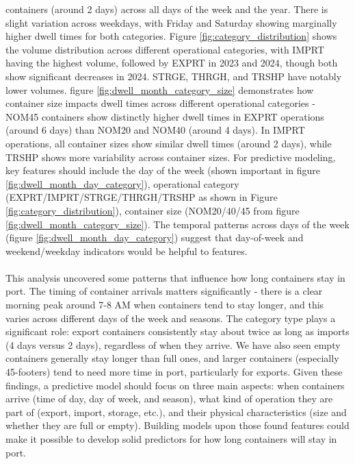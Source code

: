 			containers (around 2 days) across all days of the week and the year. There is slight variation across
			weekdays, with Friday and Saturday showing marginally higher dwell times for both categories. Figure
			\ref{fig:category_distribution} shows the volume distribution across different operational categories,
			with IMPRT having the highest volume, followed by EXPRT in 2023 and 2024, though both show significant
			decreases in 2024. STRGE, THRGH, and TRSHP have notably lower volumes. figure
			\ref{fig:dwell_month_category_size} demonstrates how container size impacts dwell times across different
			operational categories - NOM45 containers show distinctly higher dwell times in EXPRT operations (around
			6 days) than NOM20 and NOM40 (around 4 days). In IMPRT operations, all container sizes show similar
			dwell times (around 2 days), while TRSHP shows more variability across container sizes. For predictive
			modeling, key features should include the day of the week (shown important in figure
			\ref{fig:dwell_month_day_category}), operational category (EXPRT/IMPRT/STRGE/THRGH/TRSHP as shown in
			Figure \ref{fig:category_distribution}), container size (NOM20/40/45 from figure
			\ref{fig:dwell_month_category_size}). The temporal patterns across days of the week (figure
			\ref{fig:dwell_month_day_category}) suggest that day-of-week and weekend/weekday indicators would be
			helpful to features.
			\\
			\\
			This analysis uncovered some patterns that influence how long containers stay in port. The timing of
			container arrivals matters significantly - there is a clear morning peak around 7-8 AM when containers tend
			to stay longer, and this varies across different days of the week and seasons. The category type plays a
			significant role: export containers consistently stay about twice as long as imports (4 days versus 2
			days), regardless of when they arrive. We have also seen empty containers generally stay longer than full
			ones, and larger containers (especially 45-footers) tend to need more time in port, particularly for
			exports. Given these findings, a predictive model should focus on three main aspects: when containers
			arrive (time of day, day of week, and season), what kind of operation they are part of (export, import,
			storage, etc.), and their physical characteristics (size and whether they are full or empty). Building
			models upon those found features could make it possible to develop solid predictors for how long
			containers will stay in port.